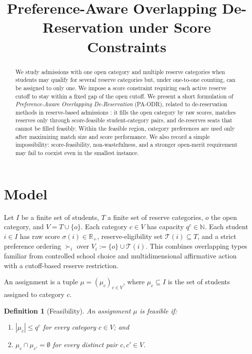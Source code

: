 \documentclass[10pt]{article}
\title{Preference-Aware Overlapping De-Reservation under Score Constraints}
\author{}
\date{}
\newtheorem{definition}{Definition}
\newcommand{\T}{\mathcal{T}}
\newcommand{\R}{\mathbb{R}}
\begin{document}
\maketitle
\vspace{-2em}

\begin{abstract}
We study admissions with one open category and multiple reserve categories when students may qualify for several reserve categories but, under one-to-one counting, can be assigned to only one. We impose a score constraint requiring each active reserve cutoff to stay within a fixed gap of the open cutoff. We present a short formulation of \emph{Preference-Aware Overlapping De-Reservation} (PA-ODR), related to de-reservation methods in reserve-based admissions \citep{AyTu20a,AyTu23a}: it fills the open category by raw scores, matches reserves only through score-feasible student-category pairs, and de-reserves seats that cannot be filled feasibly. Within the feasible region, category preferences are used only after maximizing match size and score performance. We also record a simple impossibility: score-feasibility, non-wastefulness, and a stronger open-merit requirement may fail to coexist even in the smallest instance.
\end{abstract}

\section{Model}

Let $I$ be a finite set of students, $T$ a finite set of reserve categories, $o$ the open category, and $V=T\cup\{o\}$. Each category $c\in V$ has capacity $q^c\in\mathbb{N}$. Each student $i\in I$ has raw score $\sigma(i)\in\R_+$, reserve-eligibility set $\T(i)\subseteq T$, and a strict preference ordering $\succ_i$ over $V_i:=\{o\}\cup\T(i)$. This combines overlapping types familiar from controlled school choice and multidimensional affirmative action \citep{KHIY17a,AyBo21a} with a cutoff-based reserve restriction.

An assignment is a tuple $\mu=(\mu_c)_{c\in V}$, where $\mu_c\subseteq I$ is the set of students assigned to category $c$.

\begin{definition}[Feasibility]
\label{def:paodr-feasibility}
An assignment $\mu$ is feasible if:
\begin{enumerate}
\item $|\mu_c|\le q^c$ for every category $c\in V$; and
\item $\mu_c\cap\mu_{c'}=\emptyset$ for every distinct pair $c,c'\in V$.
\end{enumerate}
\end{definition}
\end{document}
